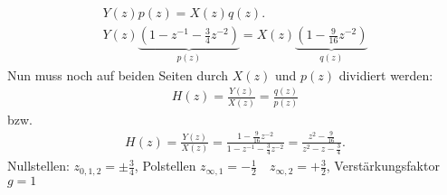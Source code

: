 \documentclass[11pt,a4paper,DIV=12]{scrartcl}
\begin{document}
\begin{gather}
	Y(z)p(z)=X(z)q(z).\\
	Y(z) \underbrace{(1 - z^{-1} - \frac{3}{4} z^{-2})}_{p(z)} = X(z) \underbrace{(1 - \frac{9}{16} z^{-2})}_{q(z)}
\end{gather}
Nun muss noch auf beiden Seiten durch $X(z)$ und $p(z)$ dividiert werden:
\begin{gather}
	H(z)=\frac{Y(z)}{X(z)}=\frac{q(z)}{p(z)}
\end{gather}
bzw.
\begin{gather}
	H(z) = \frac{Y(z)}{X(z)} = \frac{1 - \frac{9}{16} z^{-2}}{1 - z^{-1} - \frac{3}{4} z^{-2}}
	= \frac{z^2 - \frac{9}{16}}{z^2 - z - \frac{3}{4}}.
\end{gather}
Nullstellen:
$z_{0,1,2} = \pm\frac{3}{4}$,
Polstellen
$z_{\infty,1} = -\frac{1}{2}\quad z_{\infty,2} = +\frac{3}{2}$,
Verstärkungsfaktor $g=1$
\end{document}
